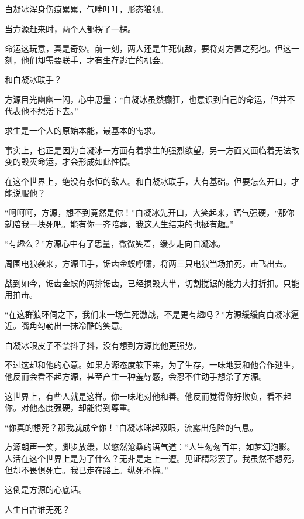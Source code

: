 
\begin{this_body}



白凝冰浑身伤痕累累，气喘吁吁，形态狼狈。

当方源赶来时，两个人都楞了一楞。

命运这玩意，真是奇妙。前一刻，两人还是生死仇敌，要将对方置之死地。但这一刻，他们却需要联手，才有生存逃亡的机会。

和白凝冰联手？

方源目光幽幽一闪，心中思量：“白凝冰虽然癫狂，也意识到自己的命运，但并不代表他不想活下去。”

求生是一个人的原始本能，最基本的需求。

事实上，也正是因为白凝冰一方面有着求生的强烈欲望，另一方面又面临着无法改变的毁灭命运，才会形成如此性情。

在这个世界上，绝没有永恒的敌人。和白凝冰联手，大有基础。但要怎么开口，才能说服他？

“呵呵呵，方源，想不到竟然是你！”白凝冰先开口，大笑起来，语气强硬，“那你就陪我一块死吧。能有你一齐陪葬，我这人生结束的也挺有趣。”

“有趣么？”方源心中有了思量，微微笑着，缓步走向白凝冰。

周围电狼袭来，方源甩手，锯齿金蜈呼啸，将两三只电狼当场拍死，击飞出去。

战到如今，锯齿金蜈的两排锯齿，已经损毁大半，切割搅锯的能力大打折扣。只能用拍击。

“在这群狼环伺之下，我们来一场生死激战，不是更有趣吗？”方源缓缓向白凝冰逼近。嘴角勾勒出一抹冷酷的笑意。

白凝冰眼皮子不禁抖了抖，没有想到方源比他更强势。

不过这却和他的心意。如果方源态度软下来，为了生存，一味地要和他合作逃生，他反而会看不起方源，甚至产生一种羞辱感，会忍不住动手想杀了方源。

这世界上，有些人就是这样。你一味地对他和善。他反而觉得你好欺负，看不起你。对他态度强硬，却能得到尊重。

“你真的想死？那我就成全你！”白凝冰眯起双眼，流露出危险的气息。

方源朗声一笑，脚步放缓，以悠然沧桑的语气道：“人生匆匆百年，如梦幻泡影。人活在这个世界上是为了什么？无非是走上一遭。见证精彩罢了。我虽然不想死，但却不畏惧死亡。我已走在路上。纵死不悔。”

这倒是方源的心底话。

人生自古谁无死？


\end{this_body}
